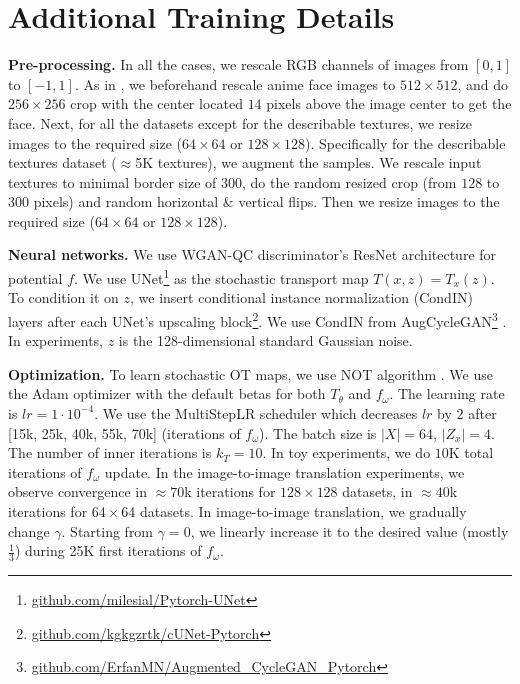 \documentclass{article} %
\begin{document}
\section{Additional Training Details}
\label{sec-details}

\textbf{Pre-processing.} In all the cases, we rescale RGB channels of images from $[0,1]$ to $[-1,1]$. As in \citep{korotin2023neural}, we beforehand rescale anime face images to $512\times 512$, and do $256\times 256$ crop with the center located $14$ pixels above the image center to get the face. Next, for all the datasets except for the describable textures, we resize images to the required size ($64\times 64$ or $128\times 128$). Specifically for the describable textures dataset ($\approx$5K textures), we augment the samples. We rescale input textures to minimal border size of 300, do the random resized crop (from $128$ to $300$ pixels) and random horizontal \& vertical flips. Then we resize images to the required size ($64\times 64$ or $128\times 128$).




% 

\textbf{Neural networks.} We use WGAN-QC discriminator's ResNet architecture \citep{liu2019wasserstein} for potential $f$. We use UNet\footnote{\url{github.com/milesial/Pytorch-UNet}} \citep{ronneberger2015u} as the stochastic transport map $T(x,z)=T_{x}(z)$. To condition it on $z$, we insert conditional instance normalization (CondIN) layers after each UNet's upscaling block\footnote{\url{github.com/kgkgzrtk/cUNet-Pytorch}}. We use CondIN from AugCycleGAN\footnote{\url{github.com/ErfanMN/Augmented_CycleGAN_Pytorch}} \citep{almahairi2018augmented}. In experiments, $z$ is the 128-dimensional standard Gaussian noise.

\textbf{Optimization.} To learn stochastic OT maps, we use NOT algorithm \citep[Algorithm 1]{korotin2023neural}. We use the Adam optimizer \citep{kingma2014adam} with the default betas for both $T_{\theta}$ and $f_{\omega}$. The learning rate is $lr=1\cdot 10^{-4}$. We use the MultiStepLR scheduler which decreases $lr$ by $2$ after [15k, 25k, 40k, 55k, 70k] (iterations of $f_{\omega}$). The batch size is $|X|=64$, $|Z_x|=4$. The number of inner iterations is $k_{T}=10$. In toy experiments, we do $10$K total iterations of $f_{\omega}$ update. In the image-to-image translation experiments, we observe convergence in $\approx 70$k iterations for $128\times 128$ datasets, in $\approx 40$k iterations for $64\times 64$ datasets. In image-to-image translation, we gradually change $\gamma$. Starting from $\gamma=0$, we linearly increase it to the desired value (mostly $\frac{1}{3}$) during 25K first iterations of $f_{\omega}$.
\end{document}
